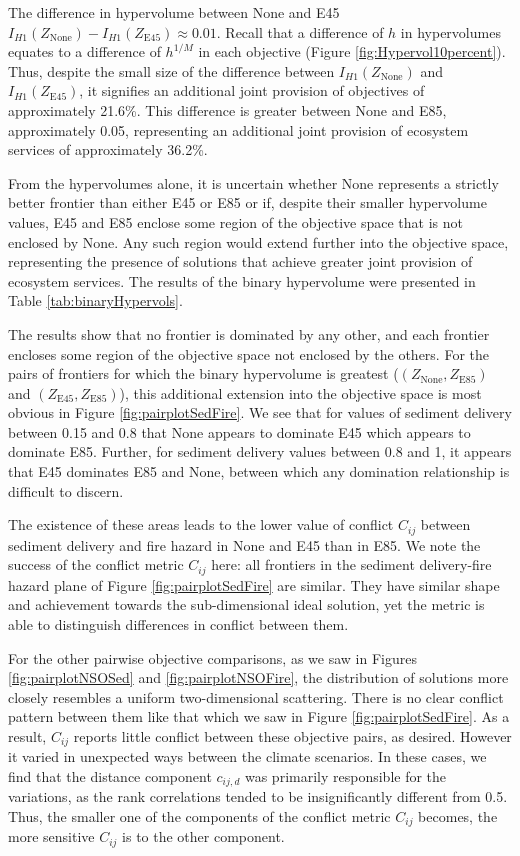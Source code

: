 The difference in hypervolume between None and E45 $I_{H1}(Z_\text{None}) - I_{H1}(Z_\text{E45}) \approx 0.01$. Recall that a difference of $h$ in hypervolumes equates to a difference of $h^{1/M}$ in each objective (Figure \ref{fig:Hypervol10percent}). Thus, despite the small size of the difference between $I_{H1}(Z_\text{None})$ and $I_{H1}(Z_\text{E45})$, it signifies an additional joint provision of objectives of approximately 21.6\%. This difference is greater between None and E85, approximately 0.05, representing an additional joint provision of ecosystem services of approximately 36.2\%.

From the hypervolumes alone, it is uncertain whether None represents a strictly better frontier than either E45 or E85 or if, despite their smaller hypervolume values, E45 and E85 enclose some region of the objective space that is not enclosed by None. Any such region would extend further into the objective space, representing the presence of solutions that achieve greater joint provision of ecosystem services. The results of the binary hypervolume were presented in Table \ref{tab:binaryHypervols}.

The results show that no frontier is dominated by any other, and each frontier encloses some region of the objective space not enclosed by the others. For the pairs of frontiers for which the binary hypervolume is greatest ($(Z_\text{None},Z_\text{E85})$ and $(Z_\text{E45},Z_\text{E85})$), this additional extension into the objective space is most obvious in Figure \ref{fig:pairplotSedFire}. We see that for values of sediment delivery between 0.15 and 0.8 that None appears to dominate E45 which appears to dominate E85. Further, for sediment delivery values between 0.8 and 1, it appears that E45 dominates E85 and None, between which any domination relationship is difficult to discern.

The existence of these areas leads to the lower value of conflict $C_{ij}$ between sediment delivery and fire hazard in None and E45 than in E85. We note the success of the conflict metric $C_{ij}$ here: all frontiers in the sediment delivery-fire hazard plane of Figure \ref{fig:pairplotSedFire} are similar. They have similar shape and achievement towards the sub-dimensional ideal solution, yet the metric is able to distinguish differences in conflict between them.

For the other pairwise objective comparisons, as we saw in Figures \ref{fig:pairplotNSOSed} and \ref{fig:pairplotNSOFire}, the distribution of solutions more closely resembles a uniform two-dimensional scattering. There is no clear conflict pattern between them like that which we saw in Figure \ref{fig:pairplotSedFire}. As a result, $C_{ij}$ reports little conflict between these objective pairs, as desired. However it varied in unexpected ways between the climate scenarios. In these cases, we find that the distance component $c_{ij,d}$ was primarily responsible for the variations, as the rank correlations tended to be insignificantly different from 0.5. Thus, the smaller one of the components of the conflict metric $C_{ij}$ becomes, the more sensitive $C_{ij}$ is to the other component.

